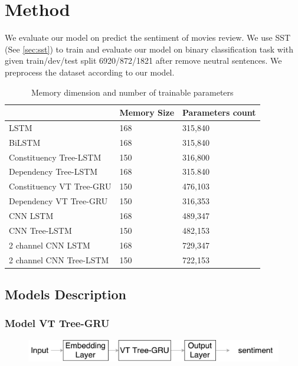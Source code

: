 \chapter{Method}\label{method}
We evaluate our model on predict the sentiment of movies review. We use SST (See \ref{sec:sst}) to train and evaluate our model on binary classification task with given train/dev/test split 6920/872/1821 after remove neutral sentences. We preprocess the dataset according to our model. 

\begin{table}[H]
	\centering
	\caption{Memory dimension and number of trainable parameters}
	\label{table:paramtable}
	\begin{tabular}{lll}
		~ & Memory Size & Parameters count \\ \hline
		LSTM                     & 168         & 315,840          \\
		BiLSTM                   & 168         & 315,840          \\
		Constituency Tree-LSTM   & 150         & 316,800          \\
		Dependency Tree-LSTM     & 168         & 315.840          \\
		Constituency VT Tree-GRU & 150         & 476,103          \\
		Dependency VT Tree-GRU   & 150         & 316,353          \\
		CNN LSTM                 & 168         & 489,347          \\
		CNN Tree-LSTM            & 150         & 482,153          \\
		2 channel CNN LSTM       & 168         & 729,347          \\
		2 channel CNN Tree-LSTM  & 150         & 722,153         
	\end{tabular}
\end{table}

\section{Models Description}
\subsection{Model VT Tree-GRU}\label{sec:VTtree}
\begin{figure}[H]
	\centering
	\includegraphics[width=0.8\linewidth]{figure/vtgrusummary.pdf}
	\caption[Convolution Tree LSTM]{}
	\label{fig:vtgrusummary}
\end{figure}

